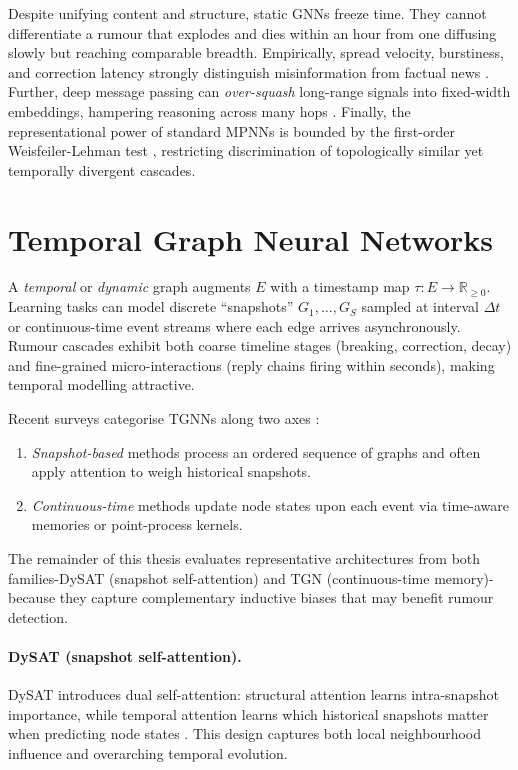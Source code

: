 \documentclass{cshonours}
\begin{document}
Despite unifying content and structure, static GNNs freeze time.  They cannot differentiate a rumour that explodes and dies within an hour from one diffusing slowly but reaching comparable breadth.  Empirically, spread velocity, burstiness, and correction latency strongly distinguish misinformation from factual news \cite{vosoughi2018spread}.  Further, deep message passing can \emph{over-squash} long-range signals into fixed-width embeddings, hampering reasoning across many hops \cite{oversquashing_gnn_2023}.  Finally, the representational power of standard MPNNs is bounded by the first-order Weisfeiler-Lehman test \cite{xu2019gin}, restricting discrimination of topologically similar yet temporally divergent cascades.


\section{Temporal Graph Neural Networks}


A \emph{temporal} or \emph{dynamic} graph augments \(E\) with a timestamp map  
\(\tau:E\!\to\!\mathbb{R}_{\ge0}\).  
Learning tasks can model discrete ``snapshots'' \(G_1,\dots,G_S\) sampled at interval \(\Delta t\) or continuous-time event streams where each edge arrives asynchronously.  Rumour cascades exhibit both coarse timeline stages (breaking, correction, decay) and fine-grained micro-interactions (reply chains firing within seconds), making temporal modelling attractive.


Recent surveys categorise TGNNs along two axes \cite{dynamic_gnn_survey_2024}:  

\begin{enumerate}
\item \emph{Snapshot-based} methods process an ordered sequence of graphs and often apply attention to weigh historical snapshots.  
\item \emph{Continuous-time} methods update node states upon each event via time-aware memories or point-process kernels.
\end{enumerate}

The remainder of this thesis evaluates representative architectures from both families-DySAT (snapshot self-attention) and TGN (continuous-time memory)-because they capture complementary inductive biases that may benefit rumour detection.

\paragraph{DySAT (snapshot self-attention).}
DySAT introduces dual self-attention:  
structural attention learns intra-snapshot importance, while temporal attention learns which historical snapshots matter when predicting node states \cite{sankar2020dysat}.  
This design captures both local neighbourhood influence and overarching temporal evolution.
\end{document}
